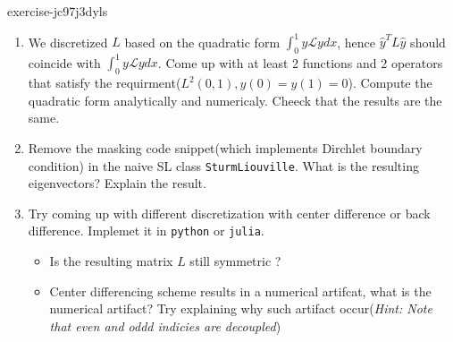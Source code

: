 \begin{mystexercise}{}{exercise-jc97j3dyls}\label{exercise-Jc97J3dyLS}\label{exercise-jc97j3dyls}\begin{enumerate}
\item We discretized $L$ based on the quadratic form $\int_0^1 y\mathcal L y dx$, hence $\hat y^T L\hat y$ should coincide with $\int_0^1 y\mathcal L y dx$. Come up with at least 2 functions and 2 operators that satisfy the requirment($L^2(0,1),y(0)=y(1)=0$). Compute the quadratic form analytically and numericaly. Cheeck that the results are the same.
\item Remove the masking code snippet(which implements Dirchlet boundary condition) in the naive SL class \texttt{SturmLiouville}. What is the resulting eigenvectors? Explain the result.
\item Try coming up with different discretization with center difference or back difference. Implemet it in \texttt{python}
or \texttt{julia}.

\begin{itemize}
\item Is the resulting matrix $L$ still symmetric ?
\item Center differencing scheme results in a numerical artifcat, what is the numerical artifact? Try explaining why such artifact occur(\textit{Hint: Note that even and oddd indicies are decoupled})
\end{itemize}
\end{enumerate}

\end{mystexercise}
%  
% 
%